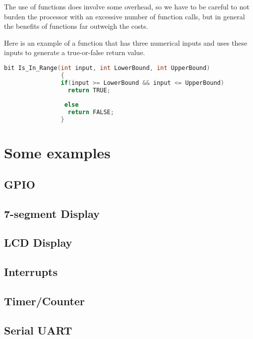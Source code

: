             The use of functions does involve some overhead, so we have to be careful to not burden the processor with an excessive number of function calls, but in general the benefits of functions far outweigh the costs.
            
            Here is an example of a function that has three numerical inputs and uses these inputs to generate a true-or-false return value.
            
                \begin{lstlisting}[backgroundcolor = \color{lightgray}, language=c]
                bit Is_In_Range(int input, int LowerBound, int UpperBound)
                {
                if(input >= LowerBound && input <= UpperBound)
                  return TRUE;
                
                 else
                  return FALSE;
                }
                \end{lstlisting}
    
\chapter{Some examples}

    \section{GPIO}
    
    \section{7-segment Display}
    
    \section{LCD Display}
    
    \section{Interrupts}
    
    \section{Timer/Counter}
    
    \section{Serial UART}
    
    

